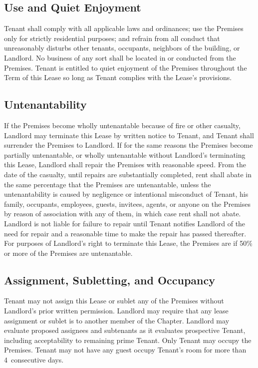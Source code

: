 \documentclass{article}
\begin{document}
\subsection{Use and Quiet Enjoyment}
Tenant shall comply with all applicable laws and ordinances; use the Premises
only for strictly residential purposes; and refrain from all conduct that
unreasonably disturbs other tenants, occupants, neighbors of the building, or
Landlord. No business of any sort shall be located in or conducted from the
Premises. Tenant is entitled to quiet enjoyment of the Premises throughout the
Term of this Lease so long as Tenant complies with the Lease’s provisions.

\subsection{Untenantability}
If the Premises become wholly untenantable because of fire or other casualty,
Landlord may terminate this Lease by written notice to Tenant, and Tenant shall
surrender the Premises to Landlord. If for the same reasons the Premises become
partially untenantable, or wholly untenantable without Landlord’s terminating
this Lease, Landlord shall repair the Premises with reasonable speed. From the
date of the casualty, until repairs are substantially completed, rent shall
abate in the same percentage that the Premises are untenantable, unless the
untenantability is caused by negligence or intentional misconduct of Tenant, his
family, occupants, employees, guests, invitees, agents, or anyone on the Premises
by reason of association with any of them, in which case rent shall not abate.
Landlord is not liable for failure to repair until Tenant notifies Landlord of
the need for repair and a reasonable time to make the repair has passed
thereafter. For purposes of Landlord’s right to terminate this Lease, the
Premises are  if 50\% or more of the
Premises are untenantable.

\subsection{Assignment, Subletting, and Occupancy}
Tenant may not assign this Lease or sublet any of the Premises without
Landlord’s prior written permission. Landlord may require that any lease
assignment or sublet is to another member of the Chapter. Landlord may evaluate
proposed assignees and subtenants as it evaluates prospective Tenant, including
acceptability to remaining prime Tenant. Only Tenant may occupy the Premises.
Tenant may not have any guest occupy Tenant’s room for more than 4~consecutive
days.
\end{document}
